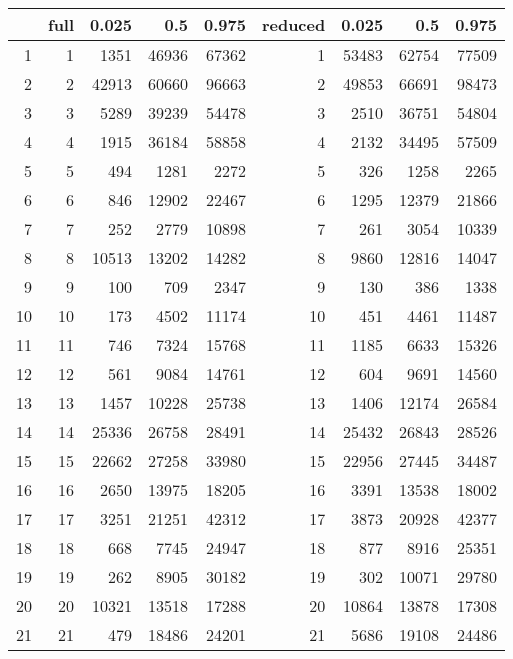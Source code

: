\documentclass{article}
\begin{document}
\begin{table}[ht]
\centering
\begin{tabular}{rrrrrrrrr}
  
  \hline
 & full & 0.025 & 0.5 & 0.975 & reduced & 0.025 & 0.5 & 0.975 \\ 
  \hline
1 & 1 & 1351 & 46936 & 67362 & 1 & 53483 & 62754 & 77509 \\ 
  2 & 2 & 42913 & 60660 & 96663 & 2 & 49853 & 66691 & 98473 \\ 
  3 & 3 & 5289 & 39239 & 54478 & 3 & 2510 & 36751 & 54804 \\ 
  4 & 4 & 1915 & 36184 & 58858 & 4 & 2132 & 34495 & 57509 \\ 
  5 & 5 & 494 & 1281 & 2272 & 5 & 326 & 1258 & 2265 \\ 
  6 & 6 & 846 & 12902 & 22467 & 6 & 1295 & 12379 & 21866 \\ 
  7 & 7 & 252 & 2779 & 10898 & 7 & 261 & 3054 & 10339 \\ 
  8 & 8 & 10513 & 13202 & 14282 & 8 & 9860 & 12816 & 14047 \\ 
  9 & 9 & 100 & 709 & 2347 & 9 & 130 & 386 & 1338 \\ 
  10 & 10 & 173 & 4502 & 11174 & 10 & 451 & 4461 & 11487 \\ 
  11 & 11 & 746 & 7324 & 15768 & 11 & 1185 & 6633 & 15326 \\ 
  12 & 12 & 561 & 9084 & 14761 & 12 & 604 & 9691 & 14560 \\ 
  13 & 13 & 1457 & 10228 & 25738 & 13 & 1406 & 12174 & 26584 \\ 
  14 & 14 & 25336 & 26758 & 28491 & 14 & 25432 & 26843 & 28526 \\ 
  15 & 15 & 22662 & 27258 & 33980 & 15 & 22956 & 27445 & 34487 \\ 
  16 & 16 & 2650 & 13975 & 18205 & 16 & 3391 & 13538 & 18002 \\ 
  17 & 17 & 3251 & 21251 & 42312 & 17 & 3873 & 20928 & 42377 \\ 
  18 & 18 & 668 & 7745 & 24947 & 18 & 877 & 8916 & 25351 \\ 
  19 & 19 & 262 & 8905 & 30182 & 19 & 302 & 10071 & 29780 \\ 
  20 & 20 & 10321 & 13518 & 17288 & 20 & 10864 & 13878 & 17308 \\ 
  21 & 21 & 479 & 18486 & 24201 & 21 & 5686 & 19108 & 24486 \\ 
   \hline
\end{tabular}
\end{table}
\end{document}
